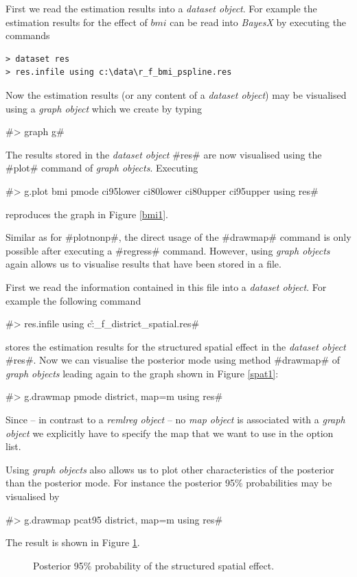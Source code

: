 \documentclass{article}
\begin{document}
First we read the estimation results into a {\it dataset object}.
For example the estimation results for the effect of $bmi$ can be
read into {\it BayesX} by executing the commands

\begin{verbatim}
> dataset res
> res.infile using c:\data\r_f_bmi_pspline.res
\end{verbatim}

Now the estimation results (or any content of a {\it dataset
object}) may be visualised using a {\it graph object} which we
create by typing

#> graph g#

The results stored in the {\em dataset object} #res# are now
visualised using the #plot# command of {\it graph objects}.
Executing

 #> g.plot bmi pmode ci95lower ci80lower ci80upper ci95upper using res#

reproduces the graph in Figure \ref{bmi1}.

Similar as for #plotnonp#, the direct usage of the #drawmap#
command is only possible after executing a #regress# command.
However, using {\it graph objects} again allows us to visualise
results that have been stored in a file.

First we read the information contained in this file into a {\it
dataset object}. For example the following command

#> res.infile using c:\data\r_f_district_spatial.res#

stores the estimation results for the structured spatial effect in
the {\em dataset object} #res#. Now we can visualise the posterior
mode using method #drawmap# of {\it graph objects} leading again
to the graph shown in Figure \ref{spat1}:

#> g.drawmap pmode district, map=m using res#

Since -- in contrast to a {\it remlreg object} -- no {\it map
object} is associated with a {\it graph object} we explicitly have
to specify the map that we want to use in the option list.

Using {\it graph objects} also allows us to plot other
characteristics of the posterior than the posterior mode. For
instance the posterior 95\% probabilities may be visualised by

#> g.drawmap pcat95 district, map=m using res#

The result is shown in Figure \ref{spat2}.

\begin{figure}[ht]
\begin{center}
{\it\caption{Posterior 95\% probability of the structured spatial
effect.\label{spat2}}}
\end{center}
\end{figure}
\end{document}
